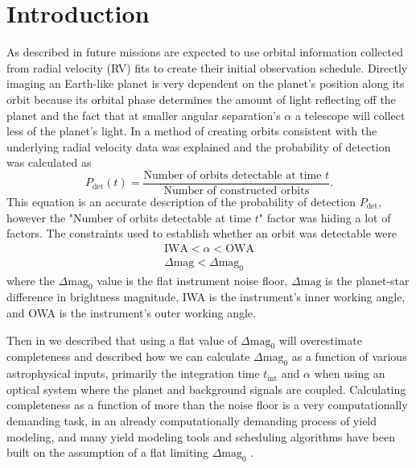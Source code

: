 \section{Introduction}
\label{sec:accurate_pdet_intro}

As described in  future missions are expected to use
orbital information collected from radial velocity (RV) fits to create their
initial observation schedule. Directly imaging an Earth-like planet is very
dependent on the planet's position along its orbit because its orbital phase
determines the amount of light reflecting off the planet and the fact that at
smaller angular separation's $\alpha$ a telescope will collect less of the planet's
light. In  a method of creating orbits consistent
with the underlying radial velocity data was explained and the probability
of detection was calculated as
\begin{equation}
    P_{\textrm{det}}(t) = \frac{\textrm{Number of orbits detectable at time $t$}}{\textrm{Number of
    constructed orbits}}
.\end{equation}
This equation is an accurate description of the probability of detection
$P_\textrm{det}$, however the "Number of orbits detectable at time $t$" factor
was hiding a lot of factors. The constraints used to establish whether an orbit
was detectable were
\begin{align}
    \text{IWA} < \alpha < \text{OWA}\\
    \Delta\mathrm{mag} < \Delta\mathrm{mag}_0
\end{align}
where the $\Delta\textrm{mag}_0$ value is the flat instrument noise floor,
$\Delta\textrm{mag}$ is the planet-star difference in brightness magnitude, IWA
is the instrument's inner working angle, and OWA is the instrument's outer
working angle.

Then in  we described that using a flat value of
$\Delta\textrm{mag}_0$ will overestimate completeness and described how we can
calculate $\Delta\textrm{mag}_0$ as a function of various astrophysical inputs,
primarily the integration time $t_\textrm{int}$ and $\alpha$ when using an
optical system where the planet and background signals are coupled. Calculating
completeness as a function of more than the noise floor is a very
computationally demanding task, in an already computationally demanding process
of yield modeling, and many yield modeling tools and scheduling algorithms have
been built on the assumption of a flat limiting $\Delta\textrm{mag}_0$
\citep{savranskyAnalyzingDesignsPlanetFinding2010,starkMaximizingExoEarthCandidate2014,
keithlyOptimalScheduling2020, garrettAnalyticalFormulation2016,
keithlyIntegrationTime2021, morganFasterExoEarth2021}.

